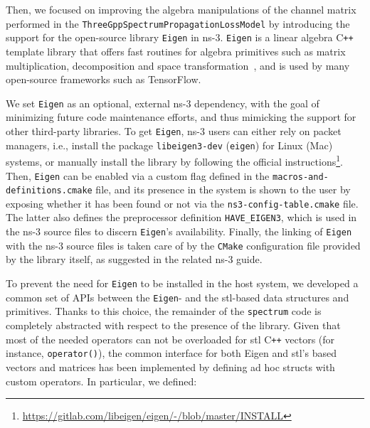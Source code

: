 Then, we focused on improving the algebra manipulations of the channel matrix performed in the \texttt{Three\-Gpp\-Spectrum\-Propagation\-Loss\-Model} by introducing the support for the open-source library \texttt{Eigen} in ns-3. \texttt{Eigen} is a  linear algebra C\texttt{++} template library that offers fast routines for algebra primitives such as matrix multiplication, decomposition and space transformation~\cite{eigenweb}, and is used by many open-source frameworks such as TensorFlow. 

We set \texttt{Eigen} as an optional, external ns-3 dependency, with the goal of minimizing future code maintenance efforts, %
and thus mimicking the support for other third-party libraries. To get \texttt{Eigen}, ns-3 users can either rely on packet managers, i.e., install the package \texttt{libeigen3-dev} (\texttt{eigen}) for Linux (Mac) systems, or manually install the library by following the official instructions\footnote{\url{https://gitlab.com/libeigen/eigen/-/blob/master/INSTALL}}. Then, \texttt{Eigen} can be enabled via a custom flag defined in the \texttt{macros-\-and-\-definitions.cmake} file, and its presence in the system is shown to the user by exposing whether it has been found or not via the \texttt{ns3-\-config-\-table.cmake} file. The latter also defines the preprocessor definition \texttt{HAVE\_EIGEN3}, which is used in the ns-3 source files to discern \texttt{Eigen}'s availability. Finally, the linking of \texttt{Eigen} with the ns-3 source files is taken care of by the \texttt{CMake} configuration file provided by the library itself, as suggested in the related ns-3 guide.

To prevent the need for \texttt{Eigen} to be installed in the host system, we developed a common set of APIs between the \texttt{Eigen}- and the \gls{stl}-based data structures and primitives. Thanks to this choice, the remainder of the \texttt{spectrum} code is completely abstracted with respect to the presence of the library.
Given that most of the needed operators can not be overloaded for \gls{stl} C\texttt{++} vectors (for instance, \texttt{operator()}), the common interface for both Eigen and \gls{stl}’s based vectors and matrices has been implemented by defining ad hoc structs with custom operators. In particular, we defined:

